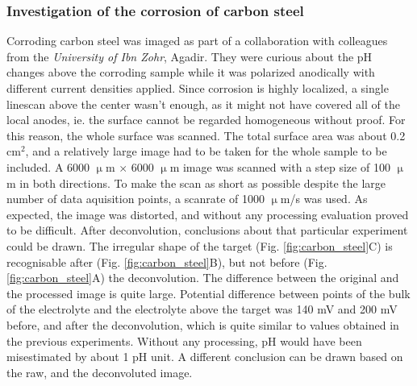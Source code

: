 			\subsubsection{Investigation of the corrosion of carbon steel}
Corroding carbon steel was imaged as part of a collaboration with colleagues from the \emph{University of Ibn Zohr}, Agadir.
They were curious about the pH changes above the corroding sample while it was polarized anodically with different current densities applied.
Since corrosion is highly localized, a single linescan above the center wasn't enough, as it might not have covered all of the local anodes, ie. the surface cannot be regarded homogeneous without proof.
For this reason, the whole surface was scanned.
The total surface area was about 0.2 cm$^2$, and a relatively large image had to be taken for the whole sample to be included.
A 6000 $\upmu$m $\times$ 6000 $\upmu$m image was scanned with a step size of 100 $\upmu$m in both directions.
To make the scan as short as possible despite the large number of data aquisition points, a scanrate of 1000 $\upmu$m/s was used.
As expected, the image was distorted, and without any processing evaluation proved to be difficult.
After deconvolution, conclusions about that particular experiment could be drawn.
The irregular shape of the target (Fig. \ref{fig:carbon_steel}C) is recognisable after (Fig. \ref{fig:carbon_steel}B), but not before (Fig. \ref{fig:carbon_steel}A) the deconvolution.
The difference between the original and the processed image is quite large.
Potential difference between points of the bulk of the electrolyte and the electrolyte above the target was 140 mV and 200 mV before, and after the deconvolution, which is quite similar to values obtained in the previous experiments.
Without any processing, pH would have been misestimated by about 1 pH unit.
A different conclusion can be drawn based on the raw, and the deconvoluted image.

